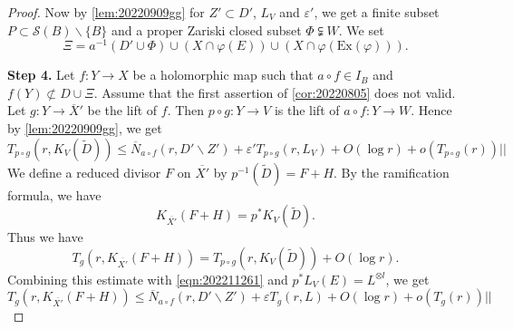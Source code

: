 \documentclass[11pt,english]{smfart}
\theoremstyle{plain}
\theoremstyle{definition}
\theoremstyle{remark}
\numberwithin{equation}{section}
\theoremstyle{plain}
\begin{document}
\begin{proof}
		Now by \cref{lem:20220909gg} for $Z'\subset D'$, $L_{V}$ and $\varepsilon'$, we get a finite subset $P\subset \mathcal{S}(B)\backslash \{ B\}$ and a proper Zariski closed subset $\Phi\subsetneqq W$.
		We set 
		$$\Xi=a^{-1}(D'\cup \Phi)\cup (X\cap \varphi(E))\cup (X\cap \varphi(\mathrm{Ex}(\varphi))).$$
		
		
		
		\textbf{Step 4.} 
		Let $f:Y\to X$ be a holomorphic map such that $a\circ f\in I_B$ and $f(Y)\not\subset D\cup \Xi$.
		Assume that the first assertion of \cref{cor:20220805} does not valid.
		Let $g:Y\to \overline{X}'$ be the lift of $f$.
		Then $p\circ g:Y\to V$ is the lift of $a\circ f:Y\to W$.
		Hence by \cref{lem:20220909gg}, we get 
		\begin{equation}\label{eqn:202211261}
			T_{p\circ g}(r,K_V(\widetilde{D}))\leq \overline{N}_{a\circ f}(r,D'\backslash Z')
			+\varepsilon' T_{p\circ g}(r,L_V)+O(\log r)+o(T_{p\circ g}(r))||
		\end{equation}
		We define a reduced divisor $F$ on $\overline{X'}$ by $p^{-1}(\widetilde{D})=F+H$.
		By the ramification formula, we have
		\begin{equation*}
			K_{\overline{X'}}(F+H)=p^*K_{V}(\widetilde{D}).
		\end{equation*}
		Thus we have
		\begin{equation*}
			T_{g}(r,K_{\overline{X'}}(F+H)) 	=T_{p\circ g}(r,K_{V}(\widetilde{D}))+O(\log r).
		\end{equation*}
		Combining this estimate with \eqref{eqn:202211261} and $p^*L_{V}(E)=L^{\otimes l}$, we get
		\begin{equation}\label{eqn:20221201}
			T_{g}(r,K_{\overline{X'}}(F+H))\leq \overline{N}_{a\circ f}(r,D'\backslash Z')
			+\varepsilon T_{g}(r,L)+O(\log r)+o(T_{ g}(r))||
		\end{equation}	
		

\end{proof}
\end{document}
